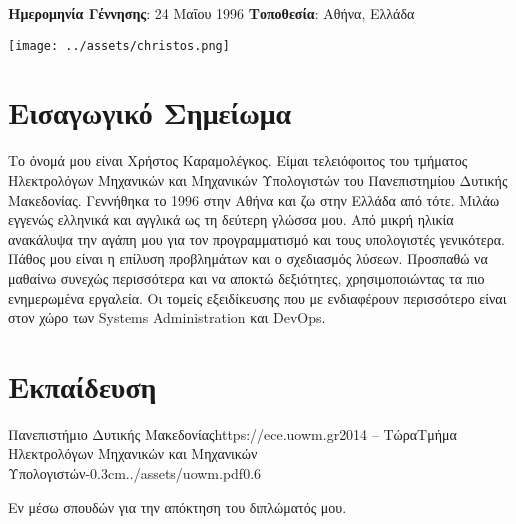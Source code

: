 \documentclass{mycv}
\begin{document}
	\pagestyle{empty}
	\begin{minipage}{.7\textwidth}
		\begin{flushleft}
			\centering
			{\bf Ημερομηνία Γέννησης}: 24 Μαΐου 1996 {\Large\textperiodcentered} {\bf Τοποθεσία}: Αθήνα, Ελλάδα
		\end{flushleft}
	\end{minipage}
	\begin{minipage}{.3\textwidth}
		\begin{flushright}
			\texttt{[image: ../assets/christos.png]}
		\end{flushright}
	\end{minipage}
	\vspace*{-0.5cm}
	\section{Εισαγωγικό Σημείωμα}
	\textnormal Το όνομά μου είναι Χρήστος Καραμολέγκος. Είμαι τελειόφοιτος του τμήματος Ηλεκτρολόγων Μηχανικών και Μηχανικών Υπολογιστών του Πανεπιστημίου Δυτικής Μακεδονίας. Γεννήθηκα το 1996 στην Αθήνα και ζω στην Ελλάδα από τότε. Μιλάω εγγενώς ελληνικά και αγγλικά ως τη δεύτερη γλώσσα μου. Από μικρή ηλικία ανακάλυψα την αγάπη μου για τον προγραμματισμό και τους υπολογιστές γενικότερα. Πάθος μου είναι η επίλυση προβλημάτων και ο σχεδιασμός λύσεων. Προσπαθώ να μαθαίνω συνεχώς περισσότερα και να αποκτώ δεξιότητες, χρησιμοποιώντας τα πιο ενημερωμένα εργαλεία. Οι τομείς εξειδίκευσης που με ενδιαφέρουν περισσότερο είναι στον χώρο των Systems Administration και DevOps.
	
	\section{Εκπαίδευση}
	
	\begin{EntryDatedLogo}{Πανεπιστήμιο Δυτικής Μακεδονίας}{https://ece.uowm.gr}{2014 -- Τώρα}{Τμήμα Ηλεκτρολόγων Μηχανικών και Μηχανικών Υπολογιστών}{-0.3cm}{../assets/uowm.pdf}{0.6}
	\begin{Itemize}
		\item Εν μέσω σπουδών για την απόκτηση του διπλώματός μου.
	\end{Itemize}
	\end{EntryDatedLogo}
\end{document}
